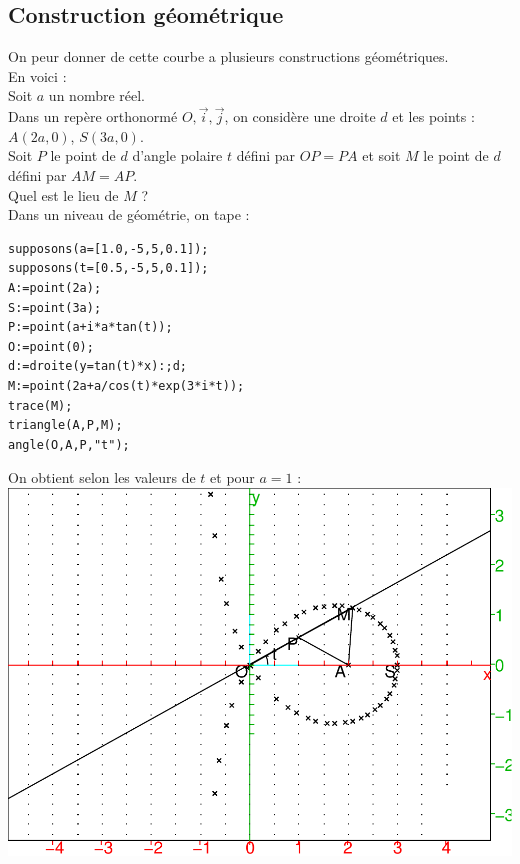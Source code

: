 \documentclass[a4paper,11pt]{book}
\begin{document}
\subsection{Construction g\'eom\'etrique}
On peur donner de cette courbe a plusieurs constructions g\'eom\'etriques.\\
En voici :\\
Soit $a$ un nombre r\'eel.\\
Dans un rep\`ere orthonorm\'e $O,\overrightarrow i,\overrightarrow j$, on 
consid\`ere une droite $d$ et les points :\\
$A(2a,0)$, $S(3a,0)$.\\
Soit $P$ le point de $d$ d'angle polaire $t$ d\'efini par $OP=PA$ et soit $M$ le point de $d$ 
d\'efini par $AM=AP$.\\
Quel est le lieu de $M$ ?\\
Dans un niveau de g\'eom\'etrie, on tape :\\
\begin{verbatim}
supposons(a=[1.0,-5,5,0.1]);
supposons(t=[0.5,-5,5,0.1]);
A:=point(2a);
S:=point(3a);
P:=point(a+i*a*tan(t));
O:=point(0);
d:=droite(y=tan(t)*x):;d;
M:=point(2a+a/cos(t)*exp(3*i*t));
trace(M);
triangle(A,P,M);
angle(O,A,P,"t");
\end{verbatim}
On obtient selon les valeurs de $t$ et pour $a=1$ :\\
\includegraphics[width=\textwidth]{trisect0}\\
\end{document}
